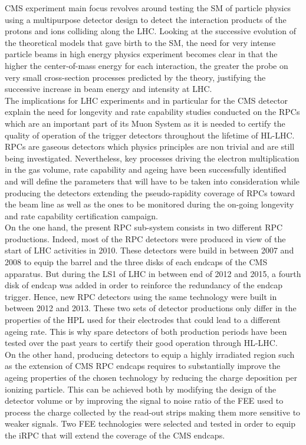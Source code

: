 CMS experiment main focus revolves around testing the \acf{SM} of particle physics using a multipurpose detector design to detect the interaction products of the protons and ions colliding along the LHC. Looking at the successive evolution of the theoretical models that gave birth to the SM, the need for very intense particle beams in high energy physics experiment becomes clear in that the higher the center-of-mass energy for each interaction, the greater the probe on very small cross-section processes predicted by the theory, justifying the successive increase in beam energy and intensity at LHC.\\
The implications for LHC experiments and in particular for the CMS detector explain the need for longevity and rate capability studies conducted on the \acl{RPC}s which are an important part of its Muon System as it is needed to certify the quality of operation of the trigger detectors throughout the lifetime of HL-LHC.\\
RPCs are gaseous detectors which physics principles are non trivial and are still being investigated. Nevertheless, key processes driving the electron multiplication in the gas volume, rate capability and ageing have been successfully identified and will define the parameters that will have to be taken into consideration while producing the detectors extending the pseudo-rapidity coverage of RPCs toward the beam line as well as the ones to be monitored during the on-going longevity and rate capability certification campaign.\\
On the one hand, the present RPC sub-system consists in two different RPC productions. Indeed, most of the RPC detectors were produced in view of the start of LHC activities in 2010. These detectors were build in between 2007 and 2008 to equip the barrel and the three disks of each endcaps of the CMS apparatus. But during the \acf{LS1} of LHC in between end of 2012 and 2015, a fourth disk of endcap was added in order to reinforce the redundancy of the endcap trigger. Hence, new RPC detectors using the same technology were built in between 2012 and 2013. These two sets of detector productions only differ in the properties of the \acf{HPL} used for their electrodes that could lead to a different ageing rate. This is why spare detectors of both production periods have been tested over the past years to certify their good operation through HL-LHC.\\
On the other hand, producing detectors to equip a highly irradiated region such as the extension of CMS RPC endcaps requires to substantially improve the ageing properties of the chosen technology by reducing the charge deposition per ionizing particle. This can be achieved both by modifying the design of the detector volume or by improving the signal to noise ratio of the \acf{FEE} used to process the charge collected by the read-out strips making them more sensitive to weaker signals. Two FEE technologies were selected and tested in order to equip the \acf{iRPC} that will extend the coverage of the CMS endcaps.\\
